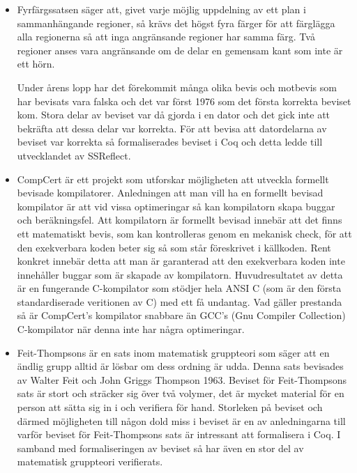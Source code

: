 \begin{itemize}

\item Fyrfärgssatsen\autocite{gonthier2008formal} säger att, givet varje möjlig
uppdelning av ett plan i sammanhängande regioner, så krävs det högst fyra
färger för att färglägga alla regionerna så att inga angränsande regioner har
samma färg. Två regioner anses vara angränsande om de delar en gemensam kant
som inte är ett hörn.

Under årens lopp har det förekommit många olika bevis och motbevis som har
bevisats vara falska och  det var först 1976 som det första korrekta beviset
kom. Stora delar av beviset var då gjorda i en dator och det gick inte att
bekräfta att dessa delar var korrekta. För att bevisa att datordelarna av
beviset var korrekta så formaliserades beviset i Coq och detta ledde till
utvecklandet av SSReflect.

\item CompCert\autocite{compcert} är ett projekt som utforskar möjligheten att
utveckla formellt bevisade kompilatorer. Anledningen att man vill ha en
formellt bevisad kompilator är att vid vissa optimeringar så kan kompilatorn
skapa buggar och beräkningsfel. Att kompilatorn är formellt bevisad innebär att
det finns ett matematiskt bevis, som kan kontrolleras genom en mekanisk check,
för att den exekverbara koden beter sig så som står föreskrivet i källkoden.
Rent konkret innebär detta att man är garanterad att den exekverbara koden inte
innehåller buggar som är skapade av kompilatorn. Huvudresultatet av detta
är en fungerande C-kompilator som stödjer hela ANSI C (som är den första
standardiserade veritionen av C) med ett få undantag.
Vad gäller prestanda så är CompCert's kompilator snabbare än
GCC's (Gnu Compiler Collection) C-kompilator när denna inte
har några optimeringar.

\item Feit-Thompsons är en sats inom matematisk gruppteori som säger att en
ändlig grupp alltid är lösbar om dess ordning är
udda\cite{aschbacher2004status}. Denna sats bevisades av Walter Feit och John
Griggs Thompson 1963. Beviset för Feit-Thompsons sats är stort och sträcker sig
över två volymer, det är mycket material för en person att sätta sig in i och
verifiera för hand. Storleken på beviset och därmed möjligheten till någon dold
miss i beviset är en av anledningarna till varför beviset för Feit-Thompsons
sats är intressant att formalisera i Coq. I samband med formaliseringen av
beviset så har även en stor del av matematisk gruppteori verifierats.

\end{itemize}

